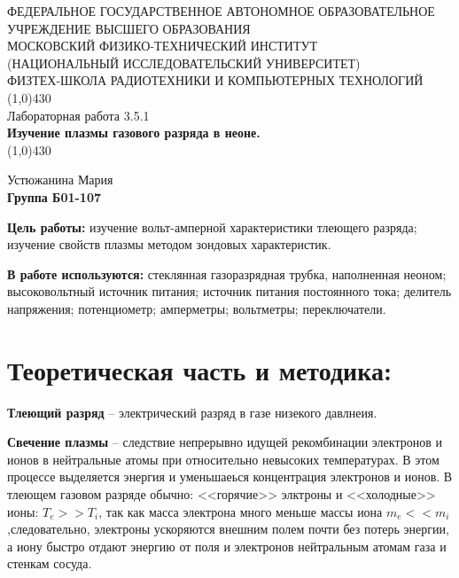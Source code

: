 \documentclass[11pt]{article}
\begin{document}
\begin{titlepage}
\begin{center}
\large{\small ФЕДЕРАЛЬНОЕ ГОСУДАРСТВЕННОЕ АВТОНОМНОЕ ОБРАЗОВАТЕЛЬНОЕ\\ УЧРЕЖДЕНИЕ ВЫСШЕГО ОБРАЗОВАНИЯ\\ МОСКОВСКИЙ ФИЗИКО-ТЕХНИЧЕСКИЙ ИНСТИТУТ\\ (НАЦИОНАЛЬНЫЙ ИССЛЕДОВАТЕЛЬСКИЙ УНИВЕРСИТЕТ)\\ ФИЗТЕХ-ШКОЛА РАДИОТЕХНИКИ И КОМПЬЮТЕРНЫХ ТЕХНОЛОГИЙ}
\vfill
\line(1,0){430}\\[1mm]
\huge{Лабораторная работа 3.5.1}\\
\huge\textbf{Изучение плазмы газового разряда в неоне.}\\
\line(1,0){430}\\[1mm]
\vfill
\begin{flushright}
\normalsize{Устюжанина Мария}\\
\normalsize{\textbf{Группа Б01-107}}\\
\end{flushright}
\end{center}
\end{titlepage}

\par \textbf{Цель работы:} изучение вольт-амперной характеристики тлеющего разряда; изучение свойств плазмы методом зондовых характеристик.
    
\par \textbf{В работе используются:} стеклянная газоразрядная трубка, наполненная неоном; высоковольтный источник питания; источник питания постоянного тока; делитель напряжения; потенциометр; амперметры; вольтметры; переключатели.

\section{Теоретическая часть и методика:}


 \textbf{Тлеющий разряд} -- электрический разряд в газе низекого давлнеия.
 
    \textbf{Свечение плазмы} -- следствие непрерывно идущей рекомбинации электронов и ионов в нейтральные атомы при относительно невысоких температурах. В этом процессе выделяется энергия и уменьшаеься концентрация электронов и ионов. В тлеющем газовом разряде обычно: <<горячие>> элктроны и <<холодные>> ионы: $T_e > > T_i$, так как масса электрона много меньше массы иона $m_e < < m_i$,следовательно, электроны ускоряются внешним полем почти без потерь энергии, а иону быстро отдают энергию от поля и электронов нейтральным атомам газа и стенкам сосуда.
\end{document}
